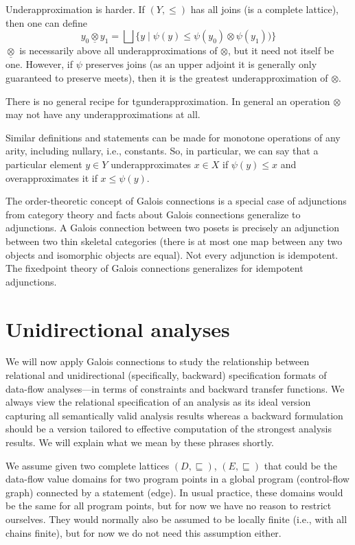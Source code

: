 \documentclass{llncs}
\newcommand{\bigjoin}{\bigsqcup}
\newcommand{\sqleq}{\sqsubseteq}
\begin{document}
Underapproximation is harder. If $(Y, \leq)$ has all joins (is a
complete lattice), then one can define
\[
y_0 \mathbin{\underline{\otimes}} y_1 = \bigjoin \{ y \mid \psi(y) \leq \psi(y_0) \otimes \psi(y_1))\} 
\]
$\underline{\otimes}$ is necessarily above all underapproximations of
$\otimes$, but it need not itself be one. However, if $\psi$ preserves
joins (as an upper adjoint it is generally only guaranteed to preserve
meets), then it is the greatest underapproximation of $\otimes$.

There is no general recipe for tgunderapproximation. In general an
operation $\otimes$ may not have any underapproximations at all.

Similar definitions and statements can be made for monotone operations
of any arity, including nullary, i.e., constants.  So, in particular,
we can say that a particular element $y \in Y$ underapproximates
$x \in X$ if $\psi(y) \leq x$ and overapproximates it if
$x \leq \psi(y)$.

The order-theoretic concept of Galois connections is a special case of
adjunctions from category theory and facts about Galois connections
generalize to adjunctions. A Galois connection between two posets is
precisely an adjunction between two thin skeletal categories (there is
at most one map between any two objects and isomorphic objects are
equal). Not every adjunction is idempotent. The fixedpoint theory of
Galois connections generalizes for idempotent adjunctions.


\section{Unidirectional analyses}

We will now apply Galois connections to study the relationship between
relational and unidirectional (specifically, backward) specification
formats of data-flow analyses---in terms of constraints and backward
transfer functions. We always view the relational specification of an
analysis as its ideal version capturing all semantically valid
analysis results whereas a backward formulation should be a version
tailored to effective computation of the strongest analysis
results. We will explain what we mean by these phrases shortly.

We assume given two complete lattices $(D, \sqleq)$, $(E, \sqleq)$
that could be the data-flow value domains for two program points in a
global program (control-flow graph) connected by a statement
(edge). In usual practice, these domains would be the same for all
program points, but for now we have no reason to restrict
ourselves. They would normally also be assumed to be locally finite
(i.e., with all chains finite), but for now we do not need this
assumption either.
\end{document}

